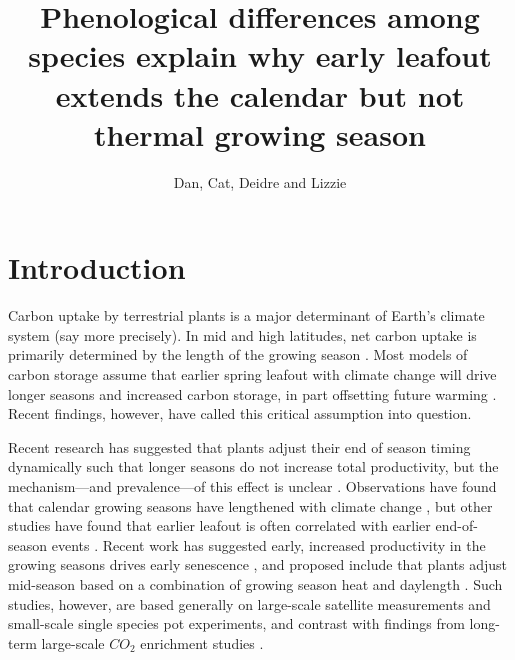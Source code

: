 \documentclass{article}[12pt]
\title{Phenological differences among species explain why early leafout extends the calendar but not thermal growing season}
\author{Dan, Cat, Deidre and Lizzie}
\begin{document}



\maketitle
\setlength{\parindent}{0pt}




\section{Introduction}
Carbon uptake by terrestrial plants is a major determinant of Earth's climate system \citep{} (say more precisely). In mid and high latitudes, net carbon uptake is primarily determined by the length of the growing season \citep{White1999}. Most models of carbon storage assume that earlier spring leafout with climate change will drive longer seasons and increased carbon storage, in part offsetting future warming \citep{Churkina2005,White1999,Keenan2014}. Recent findings, however, have called this critical assumption into question. 

Recent research has suggested that plants adjust their end of season timing dynamically such that longer seasons do not increase total productivity, but the mechanism---and prevalence---of this effect is unclear \citep{Zani2020,Norby2021,Zohner2023}. Observations have found that calendar growing seasons have lengthened with climate change \citep{Menzel1999,Liu2010}, but other studies have found that earlier leafout is often correlated with earlier end-of-season events \citep{Zani2020,Liu2016,Keenan2015}. Recent work has suggested early, increased productivity in the growing seasons drives early senescence \citep{Zani2020}, and proposed include that plants adjust mid-season based on a combination of growing season heat and daylength \citep{Zohner2023}. Such studies, however, are based generally on large-scale satellite measurements and small-scale single species pot experiments, and contrast with findings from long-term large-scale $CO_2$ enrichment studies \citep{norby2021comment}.
\end{document}
